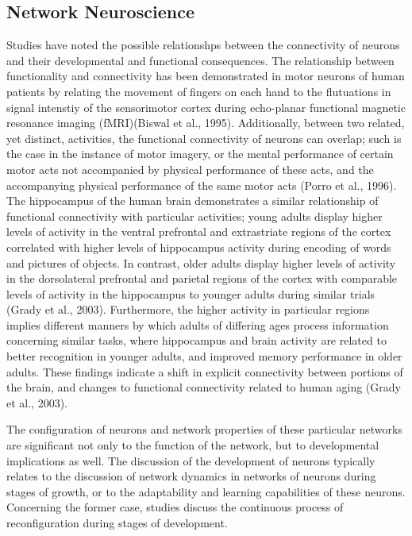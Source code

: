 \documentclass[11pt]{article}
\begin{document}
\subsection{Network Neuroscience}
Studies have noted the possible relationshps between the connectivity of neurons and their developmental and functional consequences. The relationship between functionality and connectivity has been demonstrated in motor neurons of human patients by relating the movement of fingers on each hand to the flutuations in signal intenstiy of the sensorimotor cortex during echo-planar functional magnetic resonance imaging (fMRI)(Biswal et al., 1995). Additionally, between two related, yet distinct, activities, the functional connectivity of neurons can overlap; such is the case in the instance of motor imagery, or the mental performance of certain motor acts not accompanied by physical performance of these acts, and the accompanying physical performance of the same motor acts (Porro et al., 1996). The hippocampus of the human brain demonstrates a similar relationship of functional connectivity with particular activities; young adults display higher levels of activity in the ventral prefrontal and extrastriate regions of the cortex correlated with higher levels of hippocampus activity during  encoding of words and pictures of objects. In contrast, older adults display higher levels of activity in the dorsolateral prefrontal and parietal regions of the cortex with comparable levels of activity in the hippocampus to younger adults during similar trials (Grady et al., 2003). Furthermore, the higher activity in particular regions implies different manners by which adults of differing ages process information concerning similar tasks, where hippocampus and brain activity are related to better recognition in younger adults, and improved memory performance in older adults. These findings indicate a shift in explicit connectivity between portions of the brain, and changes to functional connectivity related to human aging (Grady et al., 2003).\par

The configuration of neurons and network properties of these particular networks are significant not only to the function of the network, but to developmental implications as well. The discussion of the development of neurons typically relates to the discussion of network dynamics in networks of neurons during stages of growth, or to the adaptability and learning capabilities of these neurons. Concerning the former case, studies discuss the continuous process of reconfiguration during stages of development.
\end{document}
